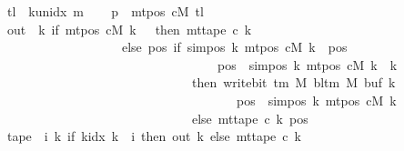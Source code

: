 \begin{isabellebody}
\ {\isacharquery}{\kern0pt}tl\ {\isacharequal}{\kern0pt}\ {\isachardoublequoteopen}k{\isacharunderscore}{\kern0pt}unidx\ {\isacharquery}{\kern0pt}m{}{\isachardoublequoteclose}\isanewline
\ \ \isamarkupfalse%
\ {\isacharquery}{\kern0pt}p\ {\isacharequal}{\kern0pt}\ {\isachardoublequoteopen}mt{\isacharunderscore}{\kern0pt}pos\ cM\ {\isacharquery}{\kern0pt}tl{\isachardoublequoteclose}\isanewline
\ \ \isamarkupfalse%
\ {\isacharquery}{\kern0pt}out\ {\isacharequal}{\kern0pt}\ {\isachardoublequoteopen}{\isasymlambda}k{\isachardot}{\kern0pt}\ if\ mt{\isacharunderscore}{\kern0pt}pos\ cM\ k\ {\isacharequal}{\kern0pt}\ {}\ then\ mt{\isacharunderscore}{\kern0pt}tape\ c{}\ k\isanewline
\ \ \ \ \ \ \ \ \ \ \ \ \ \ \ \ \ \ \ else\ {\isacharparenleft}{\kern0pt}{\isasymlambda}pos{\isachardot}{\kern0pt}\ if\ sim{\isacharunderscore}{\kern0pt}pos\ {\isacharquery}{\kern0pt}k\ {\isacharparenleft}{\kern0pt}mt{\isacharunderscore}{\kern0pt}pos\ cM\ k{\isacharparenright}{\kern0pt}\ {\isasymle}\ pos\isanewline
\ \ \ \ \ \ \ \ \ \ \ \ \ \ \ \ \ \ \ \ \ \ \ \ \ \ \ \ \ \ \ \ \ {\isasymand}\ pos\ {\isacharless}{\kern0pt}\ sim{\isacharunderscore}{\kern0pt}pos\ {\isacharquery}{\kern0pt}k\ {\isacharparenleft}{\kern0pt}mt{\isacharunderscore}{\kern0pt}pos\ cM\ k{\isacharparenright}{\kern0pt}\ {\isacharplus}{\kern0pt}\ {\isacharquery}{\kern0pt}k\isanewline
\ \ \ \ \ \ \ \ \ \ \ \ \ \ \ \ \ \ \ \ \ \ \ \ \ \ \ \ \ \ then\ write{\isacharunderscore}{\kern0pt}bit\ {\isacharparenleft}{\kern0pt}{\isasymGamma}{\isacharunderscore}{\kern0pt}tm\ M{\isacharparenright}{\kern0pt}\ {\isacharparenleft}{\kern0pt}bl{\isacharunderscore}{\kern0pt}tm\ M{\isacharparenright}{\kern0pt}\ {\isacharparenleft}{\kern0pt}buf\ k{\isacharparenright}{\kern0pt}\isanewline
\ \ \ \ \ \ \ \ \ \ \ \ \ \ \ \ \ \ \ \ \ \ \ \ \ \ \ \ \ \ \ \ \ \ \ \ \ {\isacharparenleft}{\kern0pt}pos\ {\isacharminus}{\kern0pt}\ sim{\isacharunderscore}{\kern0pt}pos\ {\isacharquery}{\kern0pt}k\ {\isacharparenleft}{\kern0pt}mt{\isacharunderscore}{\kern0pt}pos\ cM\ k{\isacharparenright}{\kern0pt}{\isacharparenright}{\kern0pt}\isanewline
\ \ \ \ \ \ \ \ \ \ \ \ \ \ \ \ \ \ \ \ \ \ \ \ \ \ \ \ \ \ else\ mt{\isacharunderscore}{\kern0pt}tape\ c{}\ k\ pos{\isacharparenright}{\kern0pt}{\isachardoublequoteclose}\isanewline
\ \ \isamarkupfalse%
\ {\isacharquery}{\kern0pt}tape\ {\isacharequal}{\kern0pt}\ {\isachardoublequoteopen}{\isasymlambda}i{\isachardot}{\kern0pt}\ {\isacharparenleft}{\kern0pt}{\isasymlambda}k{\isachardot}{\kern0pt}\ if\ k{\isacharunderscore}{\kern0pt}idx\ k\ {\isacharless}{\kern0pt}\ i\ then\ {\isacharquery}{\kern0pt}out\ k\ else\ mt{\isacharunderscore}{\kern0pt}tape\ c{}\ k{\isacharparenright}{\kern0pt}{\isachardoublequoteclose}\isanewline

\end{isabellebody}
